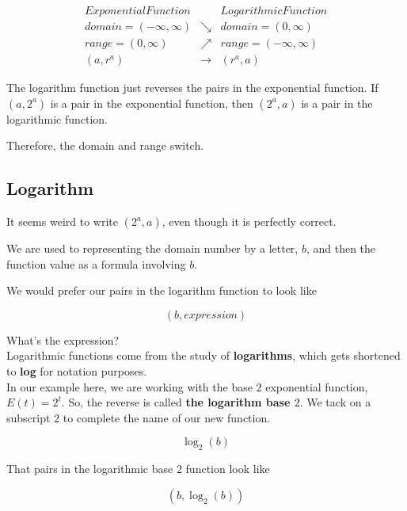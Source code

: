 \documentclass{ximera}
\begin{document}
\[
\begin{array}{lcl}
Exponential Function  &     &  Logarithmic Function  \\
domain = (-\infty, \infty)  &  \searrow  &  domain = (0, \infty)  \\
range = (0, \infty)  &  \nearrow  &  range = (-\infty, \infty)  \\
(a, r^a)    &  \longrightarrow  &   (r^a, a)
\end{array}
\]


The logarithm function just reverses the pairs in the exponential function.  If $(a, 2^a)$ is a pair in the exponential function, then $(2^a, a)$ is a pair in the logarithmic function.


Therefore, the domain and range switch. \\






\subsection*{Logarithm}

It seems weird to write $(2^a, a)$, even though it is perfectly correct.  

We are used to representing the domain number by a letter, $b$, and then the function value as a formula involving $b$.

We would prefer our pairs in the logarithm function to look like 

\[ (b, expression)  \]


What's the expression? \\





Logarithmic functions come from the study of \textbf{logarithms}, which gets shortened to \textbf{log} for notation purposes.  \\



In our example here, we are working with the base $2$ exponential function, $E(t) = 2^t$. So, the reverse is called \textbf{the logarithm base $2$}.  We tack on a subscript $2$ to complete the name of our new function.



\[   \log_2(b)     \]


That pairs in the logarithmic base $2$ function look like 


\[
(b, \log_2(b))
\]
\end{document}
